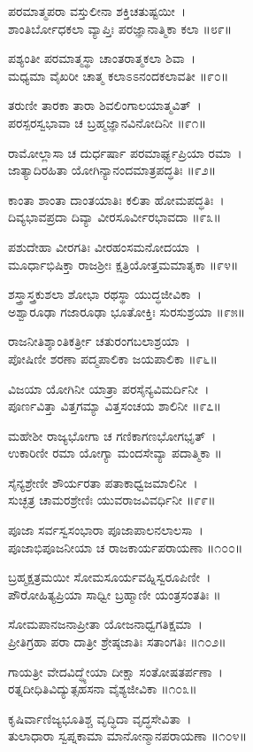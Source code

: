 ಪರಮಾತ್ಮಪರಾ ವಸ್ತುಲೀನಾ ಶಕ್ತಿಚತುಷ್ಟಯೀ~।\\
ಶಾಂತಿರ್ಬೋಧಕಲಾ ವ್ಯಾಪ್ತಿಃ ಪರಜ್ಞಾನಾತ್ಮಿಕಾ ಕಲಾ ॥೮೯॥

	ಪಶ್ಯಂತೀ ಪರಮಾತ್ಮಸ್ಥಾ ಚಾಂತರಾತ್ಮಕಲಾ ಶಿವಾ~।\\
	ಮಧ್ಯಮಾ ವೈಖರೀ ಚಾತ್ಮ ಕಲಾಽಽನಂದಕಲಾವತೀ ॥೯೦॥

ತರುಣೀ ತಾರಕಾ ತಾರಾ ಶಿವಲಿಂಗಾಲಯಾತ್ಮವಿತ್~।\\
ಪರಸ್ಪರಸ್ವಭಾವಾ ಚ ಬ್ರಹ್ಮಜ್ಞಾನವಿನೋದಿನೀ ॥೯೧॥

	ರಾಮೋಲ್ಲಾಸಾ ಚ ದುರ್ಧರ್ಷಾ ಪರಮಾರ್ಘ್ಯಪ್ರಿಯಾ ರಮಾ~।\\
	ಜಾತ್ಯಾದಿರಹಿತಾ ಯೋಗಿನ್ಯಾನಂದಮಾತ್ರಪದ್ಧತಿಃ ॥೯೨॥

ಕಾಂತಾ ಶಾಂತಾ ದಾಂತಯಾತಿಃ ಕಲಿತಾ ಹೋಮಪದ್ಧತಿಃ~।\\
ದಿವ್ಯಭಾವಪ್ರದಾ ದಿವ್ಯಾ ವೀರಸೂರ್ವೀರಭಾವದಾ ॥೯೩॥

	ಪಶುದೇಹಾ ವೀರಗತಿಃ ವೀರಹಂಸಮನೋದಯಾ~।\\
	ಮೂರ್ಧಾಭಿಷಿಕ್ತಾ ರಾಜಶ್ರೀಃ ಕ್ಷತ್ರಿಯೋತ್ತಮಮಾತೃಕಾ ॥೯೪॥

ಶಸ್ತ್ರಾಸ್ತ್ರಕುಶಲಾ ಶೋಭಾ ರಥಸ್ಥಾ ಯುದ್ಧಜೀವಿಕಾ~।\\
ಅಶ್ವಾರೂಢಾ ಗಜಾರೂಢಾ ಭೂತೋಕ್ತಿಃ ಸುರಸುಶ್ರಯಾ ॥೯೫॥

	ರಾಜನೀತಿಶ್ಶಾಂತಿಕರ್ತ್ರೀ ಚತುರಂಗಬಲಾಶ್ರಯಾ~।\\
	ಪೋಷಿಣೀ ಶರಣಾ ಪದ್ಮಪಾಲಿಕಾ ಜಯಪಾಲಿಕಾ ॥೯೬॥

ವಿಜಯಾ ಯೋಗಿನೀ ಯಾತ್ರಾ ಪರಸೈನ್ಯವಿಮರ್ದಿನೀ~।\\
ಪೂರ್ಣವಿತ್ತಾ ವಿತ್ತಗಮ್ಯಾ ವಿತ್ತಸಂಚಯ ಶಾಲಿನೀ ॥೯೭॥

	ಮಹೇಶೀ ರಾಜ್ಯಭೋಗಾ ಚ ಗಣಿಕಾಗಣಭೋಗಭೃತ್~।\\
	ಉಕಾರಿಣೀ ರಮಾ ಯೋಗ್ಯಾ ಮಂದಸೇವ್ಯಾ ಪದಾತ್ಮಿಕಾ ॥

ಸೈನ್ಯಶ್ರೇಣೀ ಶೌರ್ಯರತಾ ಪತಾಕಾಧ್ವಜಮಾಲಿನೀ~।\\
ಸುಚ್ಛತ್ರ ಚಾಮರಶ್ರೇಣಿಃ ಯುವರಾಜವಿವರ್ಧಿನೀ ॥೯೯॥

	ಪೂಜಾ ಸರ್ವಸ್ವಸಂಭಾರಾ ಪೂಜಾಪಾಲನಲಾಲಸಾ~।\\
	ಪೂಜಾಭಿಪೂಜನೀಯಾ ಚ ರಾಜಕಾರ್ಯಪರಾಯಣಾ ॥೧೦೦॥

ಬ್ರಹ್ಮಕ್ಷತ್ರಮಯೀ ಸೋಮಸೂರ್ಯವಹ್ನಿಸ್ವರೂಪಿಣೀ~।\\
ಪೌರೋಹಿತ್ಯಪ್ರಿಯಾ ಸಾಧ್ವೀ ಬ್ರಹ್ಮಾಣೀ ಯಂತ್ರಸಂತತಿಃ ॥

	ಸೋಮಪಾನಜನಾಪ್ರೀತಾ ಯೋಜನಾಧ್ವಗತಿಕ್ಷಮಾ~।\\
	ಪ್ರೀತಿಗ್ರಹಾ ಪರಾ ದಾತ್ರೀ ಶ್ರೇಷ್ಠಜಾತಿಃ ಸತಾಂಗತಿಃ ॥೧೦೨॥

ಗಾಯತ್ರೀ ವೇದವಿದ್ಧ್ಯೇಯಾ ದೀಕ್ಷಾ ಸಂತೋಷತರ್ಪಣಾ~।\\
ರತ್ನದೀಧಿತಿವಿದ್ಯುತ್ಸಹಸನಾ ವೈಶ್ಯಜೀವಿಕಾ ॥೧೦೩॥

	ಕೃಷಿರ್ವಾಣಿಜ್ಯಭೂತಿಶ್ಚ ವೃದ್ಧಿದಾ ವೃದ್ಧಸೇವಿತಾ~।\\
	ತುಲಾಧಾರಾ ಸ್ವಪ್ನಕಾಮಾ ಮಾನೋನ್ಮಾನಪರಾಯಣಾ ॥೧೦೪॥

